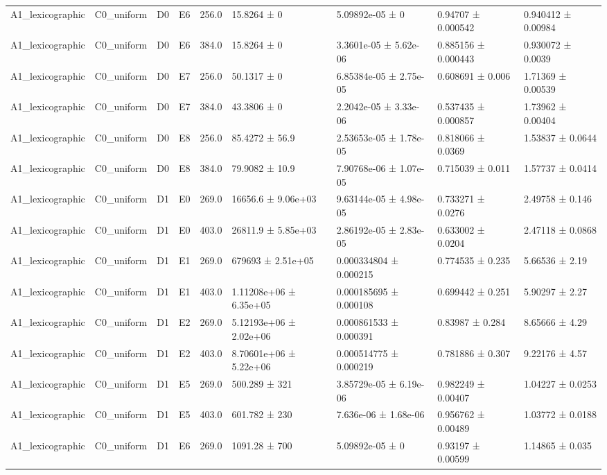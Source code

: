 \begin{table}
\begin{tabular}{lllllllll}
A1\_lexicographic & C0\_uniform & D0 & E6 & 256.0 & 15.8264 ± 0 & 5.09892e-05 ± 0 & 0.94707 ± 0.000542 & 0.940412 ± 0.00984 \\
A1\_lexicographic & C0\_uniform & D0 & E6 & 384.0 & 15.8264 ± 0 & 3.3601e-05 ± 5.62e-06 & 0.885156 ± 0.000443 & 0.930072 ± 0.0039 \\
A1\_lexicographic & C0\_uniform & D0 & E7 & 256.0 & 50.1317 ± 0 & 6.85384e-05 ± 2.75e-05 & 0.608691 ± 0.006 & 1.71369 ± 0.00539 \\
A1\_lexicographic & C0\_uniform & D0 & E7 & 384.0 & 43.3806 ± 0 & 2.2042e-05 ± 3.33e-06 & 0.537435 ± 0.000857 & 1.73962 ± 0.00404 \\
A1\_lexicographic & C0\_uniform & D0 & E8 & 256.0 & 85.4272 ± 56.9 & 2.53653e-05 ± 1.78e-05 & 0.818066 ± 0.0369 & 1.53837 ± 0.0644 \\
A1\_lexicographic & C0\_uniform & D0 & E8 & 384.0 & 79.9082 ± 10.9 & 7.90768e-06 ± 1.07e-05 & 0.715039 ± 0.011 & 1.57737 ± 0.0414 \\
A1\_lexicographic & C0\_uniform & D1 & E0 & 269.0 & 16656.6 ± 9.06e+03 & 9.63144e-05 ± 4.98e-05 & 0.733271 ± 0.0276 & 2.49758 ± 0.146 \\
A1\_lexicographic & C0\_uniform & D1 & E0 & 403.0 & 26811.9 ± 5.85e+03 & 2.86192e-05 ± 2.83e-05 & 0.633002 ± 0.0204 & 2.47118 ± 0.0868 \\
A1\_lexicographic & C0\_uniform & D1 & E1 & 269.0 & 679693 ± 2.51e+05 & 0.000334804 ± 0.000215 & 0.774535 ± 0.235 & 5.66536 ± 2.19 \\
A1\_lexicographic & C0\_uniform & D1 & E1 & 403.0 & 1.11208e+06 ± 6.35e+05 & 0.000185695 ± 0.000108 & 0.699442 ± 0.251 & 5.90297 ± 2.27 \\
A1\_lexicographic & C0\_uniform & D1 & E2 & 269.0 & 5.12193e+06 ± 2.02e+06 & 0.000861533 ± 0.000391 & 0.83987 ± 0.284 & 8.65666 ± 4.29 \\
A1\_lexicographic & C0\_uniform & D1 & E2 & 403.0 & 8.70601e+06 ± 5.22e+06 & 0.000514775 ± 0.000219 & 0.781886 ± 0.307 & 9.22176 ± 4.57 \\
A1\_lexicographic & C0\_uniform & D1 & E5 & 269.0 & 500.289 ± 321 & 3.85729e-05 ± 6.19e-06 & 0.982249 ± 0.00407 & 1.04227 ± 0.0253 \\
A1\_lexicographic & C0\_uniform & D1 & E5 & 403.0 & 601.782 ± 230 & 7.636e-06 ± 1.68e-06 & 0.956762 ± 0.00489 & 1.03772 ± 0.0188 \\
A1\_lexicographic & C0\_uniform & D1 & E6 & 269.0 & 1091.28 ± 700 & 5.09892e-05 ± 0 & 0.93197 ± 0.00599 & 1.14865 ± 0.035 \\

\end{tabular}
\end{table}
